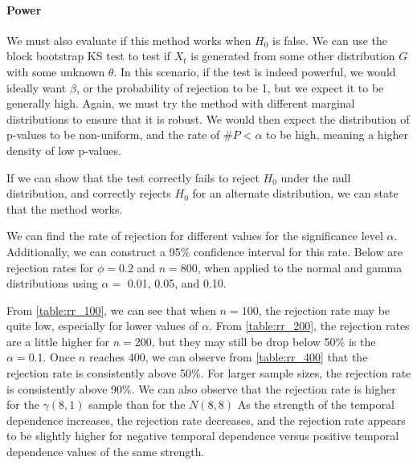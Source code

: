 \documentclass[12pt, letterpaper]{article}
\begin{document}
\paragraph{Power}
We must also evaluate if this method works when $H_0$ is false. We can use
the block bootstrap KS test to test if $X_t$ is generated from some other 
distribution $G$ with some unknown $\theta$. In this scenario, if the test is 
indeed powerful,
we would ideally want $\beta$, or the probability of rejection to be 1, but we
expect it to be generally high. Again, we must try the method with different
marginal distributions to ensure that it is robust.
We would then expect the distribution of p-values to be non-uniform, and the rate
of $\#P < \alpha$ to be high, meaning a higher density of low p-values.

If we can show that the test correctly fails to reject $H_0$ under the null
distribution, and correctly rejects $H_0$ for an alternate distribution, we can
state that the method works.

We can find the rate of rejection for  different values for the significance 
level $\alpha$. Additionally, we can construct a 95\% confidence interval for 
this rate. Below are rejection rates for $\phi = 0.2$ and $n = 800$, when
applied to the normal and gamma distributions using $\alpha =$ 0.01, 0.05, and 
0.10.



From \ref{table:rr_100}, we can see that when $n = 100$, the rejection rate may 
be quite low, especially for lower values of $\alpha$. From \ref{table:rr_200}, 
the rejection rates are a little higher for $n = 200$, but they may still be 
drop below 50\% is the $\alpha = 0.1$. Once $n$ reaches 400, we can observe 
from \ref{table:rr_400} that the rejection rate
is consistently above 50\%. For larger sample sizes, the rejection rate is 
consistently above 90\%. We can also
observe that the rejection rate is higher for the $\gamma(8, 1)$ sample than for 
the $N(8, 8)$ As the strength of the temporal dependence increases, the 
rejection rate decreases, and the rejection
rate appears to be slightly higher for negative temporal dependence versus 
positive temporal dependence values of the same strength.











\end{document}
